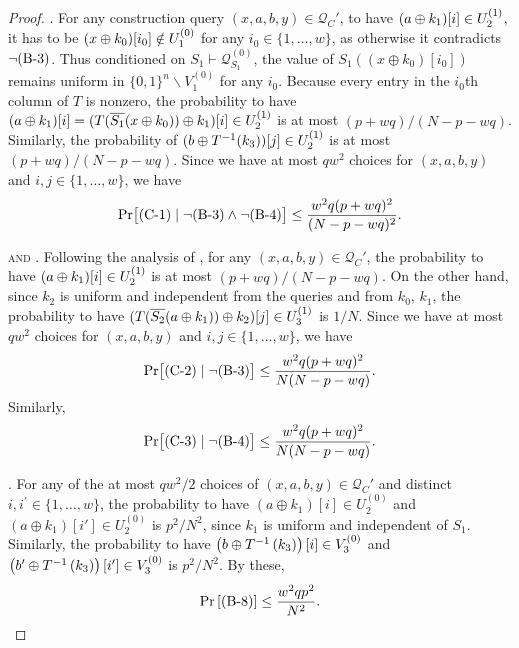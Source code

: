 \begin{proof}
\noindent \textsc{\cone}. For any construction query $(x,a,b,y)\in\mathcal{Q}_C'$, to have $(a\oplus k_1)[i]\in U_2^{(1)}$, it has to be $(x\oplus k_0)[i_0]\notin U_1^{(0)}$ for any $i_0\in\{1,\ldots,w\}$, as otherwise it contradicts $\neg\text{(B-3)}$. Thus conditioned on $S_{1} \vdash \mathcal{Q}_{S_{1}}^{(0)}$, the value of $S_1((x \oplus k_0)[i_0])$ remains uniform in $\{0, 1\}^{n} \backslash V_1^{(0)}$ for any $i_0$. Because every entry in the $i_{0}$th column of $T$ is nonzero, the probability to have $(a\oplus k_1)[i]=(T(\overline{S_1}(x\oplus k_0))\oplus k_1)[i]\in U_2^{(1)}$ is at most $(p+wq)/(N-p-wq)$. Similarly, the probability of $(b\oplus T^{-1}(k_3))[j]\in U_2^{(1)}$ is at most $(p+wq)/(N-p-wq)$. Since we have at most $qw^2$ choices for $(x,a,b,y)$ and $i, j \in\{1, \ldots, w\}$, we have
%
$$
{\Pr}\big[\text{(C-1)}\mid\neg\text{(B-3)}\wedge\neg\text{(B-4)}\big] \leq \frac{w^{2} q (p+w q)^{2}}{(N-p-wq)^{2}}.
$$




\noindent \textsc{\ctwo and \cthree}. Following the analysis of \cone, for any $(x,a,b,y)\in\mathcal{Q}_C'$, the probability to have $(a\oplus k_1)[i]\in U_{2}^{(1)}$ is at most $(p+wq)/(N-p-wq)$. On the other hand, since $k_{2}$ is uniform and independent from the queries and from $k_{0}$, $k_{1}$, the probability to have $(T(\overline{S_2}(a \oplus k_1))\oplus k_2)[j]\in U_{3}^{(1)}$ is $1/N$. Since we have at most $qw^2$ choices for $(x,a,b,y)$ and $i, j \in\{1, \ldots, w\}$, we have
%
%
$$
{\Pr}\big[\text{(C-2)}\mid\neg\text{(B-3)}\big] \leq \frac{w^{2} q (p+w q)^{2}}{N  (N-p-wq)}.
$$
%
Similarly,
%
$$
{\Pr}\big[\text{(C-3)}\mid\neg\text{(B-4)}\big] \leq \frac{w^{2} q (p+w q)^{2}}{N  (N-p-wq)}.
$$





\noindent \textsc{\beight}. For any of the at most $qw^2/2$ choices of $(x,a,b,y)\in\mathcal{Q}_C'$ and distinct $i, i^{\prime}\in\{1, \ldots, w\}$, the probability to have $(a \oplus k_1)[i]\in U_{2}^{(0)}$ and $(a \oplus k_1)[i']\in U_{2}^{(0)}$ is $p^2/N^2$, since $k_1$ is uniform and independent of $S_1$. Similarly, the probability to have $\left(b\oplus T^{-1}\left(k_3\right)\right)[i]\in V_3^{(0)}$ and
$\left(b'\oplus T^{-1}\left(k_3\right)\right)[i']\in V_3^{(0)}$ is $p^2/N^2$. By these,
%
$$
\operatorname{Pr}\left[\text{(B-8)}\right] \leq \frac{w^2qp^2}{N^2}.
$$


%
%
%
%
%







\end{proof}

